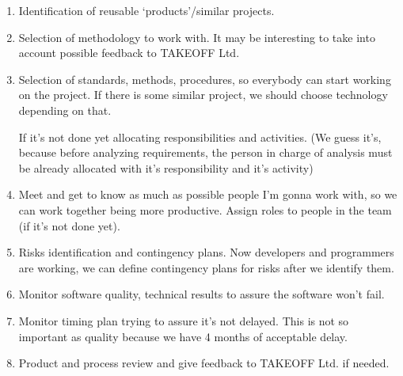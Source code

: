 \documentclass{article}
\begin{document}
\begin{enumerate}
\item Identification of reusable ‘products’/similar projects.
\item Selection of methodology to work with. It may be interesting to take into account possible feedback to TAKEOFF Ltd.
\item Selection of standards, methods, procedures, so everybody can start working on the project. If there is some similar project, we should choose technology depending on that.

If it's not done yet allocating responsibilities and activities.
(We guess it's, because before analyzing requirements, the person in charge of analysis must be already allocated with it's responsibility and it's activity)\item Meet and get to know as much as possible people I'm gonna work with, so we can work together being more productive.
 Assign roles to people in the team (if it's not done yet).
\item Risks identification and contingency plans. Now developers and programmers are working, we can define contingency plans for risks after we identify them.
\item Monitor software quality, technical results to assure the software won't fail.
\item Monitor timing plan trying to assure it's not delayed. This is not so important as quality because we have 4 months of acceptable delay.
\item Product and process review and give feedback to TAKEOFF Ltd. if needed.

\end{enumerate}
\end{document}
